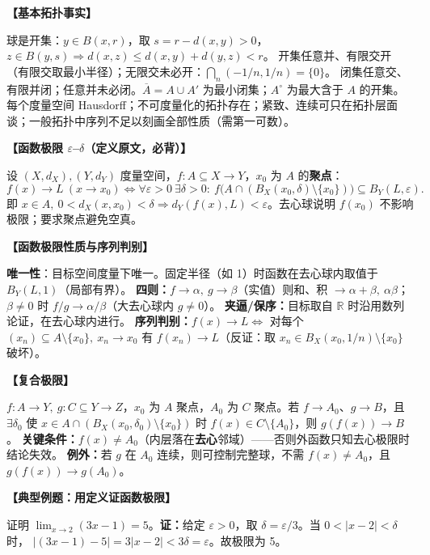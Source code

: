 \documentclass[12pt,a4paper,UTF8]{ctexart}
\newcommand{\R}{\mathbb R}
\newcommand{\eps}{\varepsilon}
\newenvironment{kp}[1]{\par\smallskip\noindent\textbf{【#1】}\par\nobreak\smallskip}{\par\smallskip}
\begin{document}
\begin{kp}{基本拓扑事实}
球是开集：$y\in B(x,r)$，取 $s=r-d(x,y)>0$，$z\in B(y,s)\Rightarrow d(x,z)\le d(x,y)+d(y,z)<r$。
开集任意并、有限交开（有限交取最小半径）；无限交未必开：$\bigcap_n(-1/n,1/n)=\{0\}$。
闭集任意交、有限并闭；任意并未必闭。$\overline A=A\cup A'$ 为最小闭集；$A^\circ$ 为最大含于 $A$ 的开集。
每个度量空间 Hausdorff；不可度量化的拓扑存在；紧致、连续可只在拓扑层面谈；一般拓扑中序列不足以刻画全部性质（需第一可数）。
\end{kp}

\begin{kp}{函数极限 $\eps$–$\delta$（定义原文，必背）}
设 $(X,d_X),(Y,d_Y)$ 度量空间，$f:A\subseteq X\to Y$，$x_0$ 为 $A$ 的\textbf{聚点}：
\[
f(x)\to L\ (x\to x_0)\iff \forall\eps>0\ \exists\delta>0:\ f\bigl(A\cap(B_X(x_0,\delta)\setminus\{x_0\})\bigr)\subseteq B_Y(L,\eps).
\]
即 $x\in A,\ 0<d_X(x,x_0)<\delta\Rightarrow d_Y(f(x),L)<\eps$。去心球说明 $f(x_0)$ 不影响极限；要求聚点避免空真。
\end{kp}

\begin{kp}{函数极限性质与序列判别}
\textbf{唯一性}：目标空间度量下唯一。固定半径（如 1）时函数在去心球内取值于 $B_Y(L,1)$（局部有界）。
\textbf{四则：}$f\to\alpha,\ g\to\beta$（实值）则和、积 $\to\alpha+\beta,\ \alpha\beta$；$\beta\ne0$ 时 $f/g\to\alpha/\beta$（大去心球内 $g\ne0$）。
\textbf{夹逼/保序：}目标取自 $\R$ 时沿用数列论证，在去心球内进行。
\textbf{序列判别：}$f(x)\to L\iff$ 对每个 $(x_n)\subseteq A\setminus\{x_0\},\ x_n\to x_0$ 有 $f(x_n)\to L$（反证：取 $x_n\in B_X(x_0,1/n)\setminus\{x_0\}$ 破坏）。
\end{kp}

\begin{kp}{复合极限}
$f:A\to Y,\ g:C\subseteq Y\to Z$，$x_0$ 为 $A$ 聚点，$A_0$ 为 $C$ 聚点。若 $f\to A_0$、$g\to B$，且 $\exists\delta_0$ 使 $x\in A\cap(B_X(x_0,\delta_0)\setminus\{x_0\})$ 时 $f(x)\in C\setminus\{A_0\}$，则 $g(f(x))\to B$。
\textbf{关键条件：}$f(x)\ne A_0$（内层落在\textbf{去心}邻域）——否则外函数只知去心极限时结论失效。
\textbf{例外：}若 $g$ 在 $A_0$ 连续，则可控制完整球，不需 $f(x)\ne A_0$，且 $g(f(x))\to g(A_0)$。
\end{kp}

\begin{kp}{典型例题：用定义证函数极限}
证明 $\lim_{x\to2}(3x-1)=5$。\textbf{证：}给定 $\eps>0$，取 $\delta=\eps/3$。当 $0<|x-2|<\delta$ 时，
$|(3x-1)-5|=3|x-2|<3\delta=\eps$。故极限为 5。
\end{kp}
\end{document}
